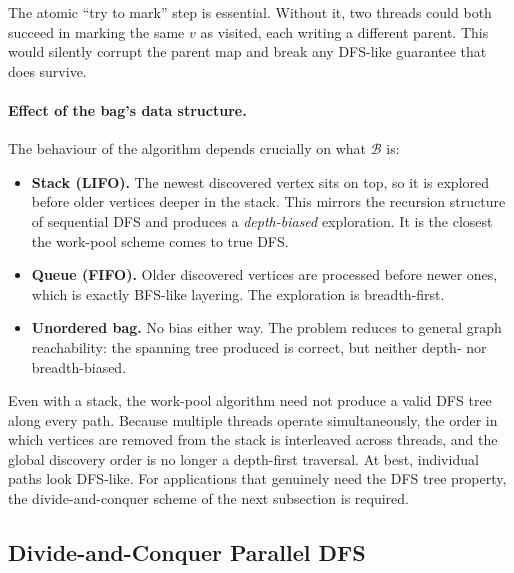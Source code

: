 The atomic ``try to mark'' step is essential.  Without it, two threads
could both succeed in marking the same $v$ as visited, each writing a
different parent.  This would silently corrupt the parent map and
break any DFS-like guarantee that does survive.

\paragraph{Effect of the bag's data structure.}
The behaviour of the algorithm depends crucially on what
$\mathcal{B}$ is:

\begin{itemize}
  \item \textbf{Stack (LIFO).}  The newest discovered vertex sits on
        top, so it is explored before older vertices deeper in the
        stack.  This mirrors the recursion structure of sequential DFS
        and produces a \emph{depth-biased} exploration.  It is the
        closest the work-pool scheme comes to true DFS.
  \item \textbf{Queue (FIFO).}  Older discovered vertices are
        processed before newer ones, which is exactly BFS-like
        layering.  The exploration is breadth-first.
  \item \textbf{Unordered bag.}  No bias either way.  The problem
        reduces to general graph reachability: the spanning tree
        produced is correct, but neither depth- nor breadth-biased.
\end{itemize}

\begin{ppnote}
Even with a stack, the work-pool algorithm need not produce a valid
DFS tree along every path.  Because multiple threads operate
simultaneously, the order in which vertices are removed from the stack
is interleaved across threads, and the global discovery order is no
longer a depth-first traversal.  At best, individual paths look DFS-like.
For applications that genuinely need the DFS tree property, the
divide-and-conquer scheme of the next subsection is required.
\end{ppnote}

\subsection{Divide-and-Conquer Parallel DFS}
\label{sec:dnc-dfs}

